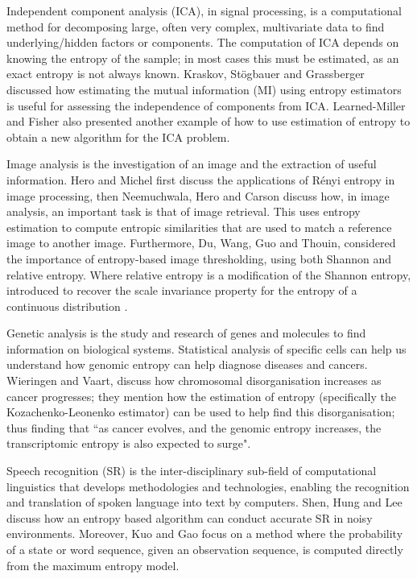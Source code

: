 \documentclass[12pt]{report}
\begin{document}
Independent component analysis (ICA), in signal processing, is a computational method for decomposing large, often very complex, multivariate data to find underlying/hidden factors or components. The computation of ICA depends on knowing the entropy of the sample; in most cases this must be estimated, as an exact entropy is not always known. Kraskov, St\"{o}gbauer and Grassberger \cite{ICA1} discussed how estimating the mutual information (MI) using entropy estimators is useful for assessing the independence of components from ICA. Learned-Miller and Fisher \cite{ICA2} also presented another example of how to use estimation of entropy to obtain a new algorithm for the ICA problem. 

Image analysis is the investigation of an image and the extraction of useful information. Hero and Michel \cite{IM2} first discuss the applications of R\'enyi entropy in image processing, then Neemuchwala, Hero and Carson \cite{IM1} discuss how, in image analysis, an important task is that of image retrieval. This uses entropy estimation to compute entropic similarities that are used to match a reference image to another image.  Furthermore, Du, Wang, Guo and Thouin, \cite{IM3} considered the importance of entropy-based image thresholding, using both Shannon and relative entropy. Where relative entropy is a modification of the Shannon entropy, introduced to recover the scale invariance property for the entropy of a continuous distribution \cite{book1}.

Genetic analysis is the study and research of genes and molecules to find information on biological systems. Statistical analysis of specific cells can help us understand how genomic entropy can help diagnose diseases and cancers. Wieringen and Vaart, \cite{gen1} discuss how chromosomal disorganisation increases as cancer progresses; they mention how the estimation of entropy (specifically the Kozachenko-Leonenko estimator) can be used to help find this disorganisation; thus finding that ``as cancer evolves, and the genomic entropy increases, the transcriptomic entropy is also expected to surge". 

Speech recognition (SR) is the inter-disciplinary sub-field of computational linguistics that develops methodologies and technologies, enabling the recognition and translation of spoken language into text by computers. Shen, Hung and Lee \cite{speech1} discuss how an entropy based algorithm can conduct accurate SR in noisy environments. Moreover, Kuo and Gao \cite{speech2} focus on a method where the probability of a state or word sequence, given an observation sequence, is computed directly from the maximum entropy model.
\end{document}
